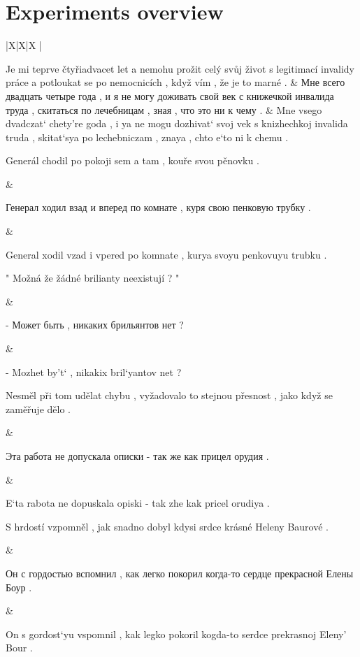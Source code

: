 \section{Experiments overview}

 { |X|X|X | }
{
\hline

Je mi teprve čtyřiadvacet let a nemohu prožit celý svůj život s legitimací invalidy práce a potloukat se po nemocnicích , když vím , že je to marné .
&
Мне всего двадцать четыре года , и я не могу доживать свой век с книжечкой инвалида труда , скитаться по лечебницам , зная , что это ни к чему .
&
Mne vsego dvadczat` chety're goda , i ya ne mogu dozhivat` svoj vek s knizhechkoj invalida truda , skitat`sya po lechebniczam , znaya , chto e`to ni k chemu .
\\ \hline

Generál chodil po pokoji sem a tam , kouře svou pěnovku .

&

Генерал ходил взад и вперед по комнате , куря свою пенковую трубку .

&

General xodil vzad i vpered po komnate , kurya svoyu penkovuyu trubku .
\\ \hline

" Možná že žádné brilianty neexistují ? "

&

- Может быть , никаких брильянтов нет ?

&

- Mozhet by't` , nikakix bril`yantov net ?
\\ \hline

Nesměl při tom udělat chybu , vyžadovalo to stejnou přesnost , jako když se zaměřuje dělo .

&

Эта работа не допускала описки - так же как прицел орудия .

&

E`ta rabota ne dopuskala opiski - tak zhe kak pricel orudiya .
\\ \hline

S hrdostí vzpomněl , jak snadno dobyl kdysi srdce krásné Heleny Baurové .

&

Он с гордостью вспомнил , как легко покорил когда-то сердце прекрасной Елены Боур .

&

On s gordost`yu vspomnil , kak legko pokoril kogda-to serdce prekrasnoj Eleny' Bour .
\\ \hline

}
